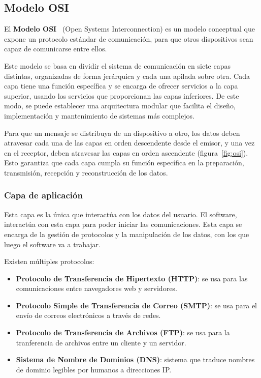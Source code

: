 \subsection{Modelo OSI}
\label{subsec:osi}
El \textbf{Modelo OSI}~\cite{modelo_osi} (Open Systems Interconnection) es un modelo conceptual que expone un protocolo estándar de comunicación, para que otros dispositivos sean capaz de comunicarse entre ellos. 

Este modelo se basa en dividir el sistema de comunicación en siete capas distintas, organizadas de forma jerárquica y cada una apilada sobre otra. Cada capa tiene una función específica y se encarga de ofrecer servicios a la capa superior, usando los servicios que proporcionan las capas inferiores. De este modo, se puede establecer una arquitectura modular que facilita el diseño, implementación y mantenimiento de sistemas más complejos.


Para que un mensaje se distribuya de un dispositivo a otro, los datos deben atravesar cada una de las capas en orden descendente desde el emisor, y una vez en el receptor, deben atravesar las capas en orden ascendente (figura~\ref{fig:osi}). Esto garantiza que cada capa cumpla su función específica en la preparación, transmisión, recepción y reconstrucción de los datos.

\subsubsection{Capa de aplicación}
\label{subsubsec:capa_aplicacion}
Esta capa es la única que interactúa con los datos del usuario. El software, interactúa con esta capa para poder iniciar las comunicaciones. Esta capa se encarga de la gestión de protocolos y la manipulación de los datos, con los que luego el software va a trabajar.

Existen múltiples protocolos:
\begin{itemize}
    \item \textbf{Protocolo de Transferencia de Hipertexto (HTTP)}: se usa para las comunicaciones entre navegadores web y servidores.
    \item \textbf{Protocolo Simple de Transferencia de Correo (SMTP)}: se usa para el envío de correos electrónicos a través de redes.
    \item \textbf{Protocolo de Transferencia de Archivos (FTP)}: se usa para la tranferencia de archivos entre un cliente y un servidor.
    \item \textbf{Sistema de Nombre de Dominios (DNS)}: sistema que traduce nombres de dominio legibles por humanos a direcciones IP.
\end{itemize}

